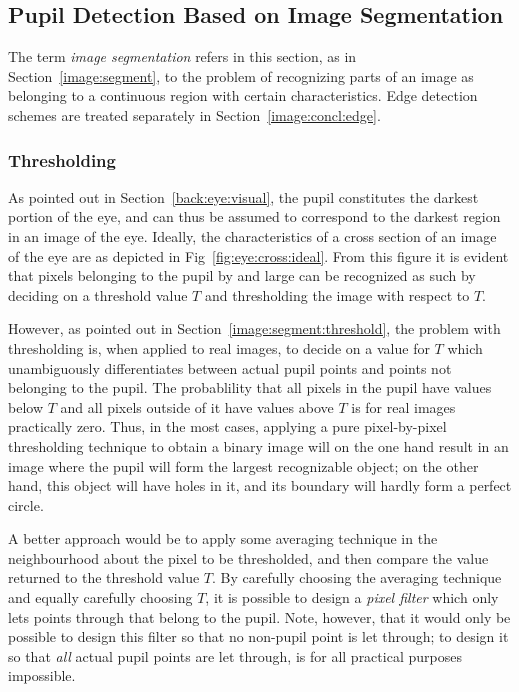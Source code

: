 \subsection{Pupil Detection Based on Image Segmentation}
\label{image:concl:segment}

The term {\em image segmentation\/} refers in this section, as in
Section~\ref{image:segment}, to the problem of recognizing parts of an
image as belonging to a continuous region with certain
characteristics.  Edge detection schemes are treated separately in
Section~\ref{image:concl:edge}.

\subsubsection{Thresholding}

As pointed out in Section~\ref{back:eye:visual}, the pupil constitutes
the darkest portion of the eye, and can thus be assumed to correspond
to the darkest region in an image of the eye.  Ideally, the
characteristics of a cross section of an image of the eye are as
depicted in Fig~\ref{fig:eye:cross:ideal}.  From this figure it is
evident that pixels belonging to the pupil by and large can be
recognized as such by deciding on a threshold value $T$ and
thresholding the image with respect to $T$.  


However, as pointed out in Section~\ref{image:segment:threshold}, the
problem with thresholding is, when applied to real images, to decide
on a value for $T$ which unambiguously differentiates between actual
pupil points and points not belonging to the pupil.  The probablility
that all pixels in the pupil have values below $T$ and all pixels
outside of it have values above $T$ is for real images practically
zero.  Thus, in the most cases, applying a pure pixel-by-pixel
thresholding technique to obtain a binary image will on the one hand
result in an image where the pupil will form the largest recognizable
object; on the other hand, this object will have holes in it, and its
boundary will hardly form a perfect circle.

A better approach would be to apply some averaging technique in the
neighbourhood about the pixel to be thresholded, and then compare the
value returned to the threshold value $T$.  By carefully choosing the
averaging technique and equally carefully choosing $T$, it is possible
to design a {\em pixel filter\/} which only lets points through that
belong to the pupil.  Note, however, that it would only be possible to
design this filter so that no non-pupil point is let through; to
design it so that {\em all\/} actual pupil points are let through, is
for all practical purposes impossible.

